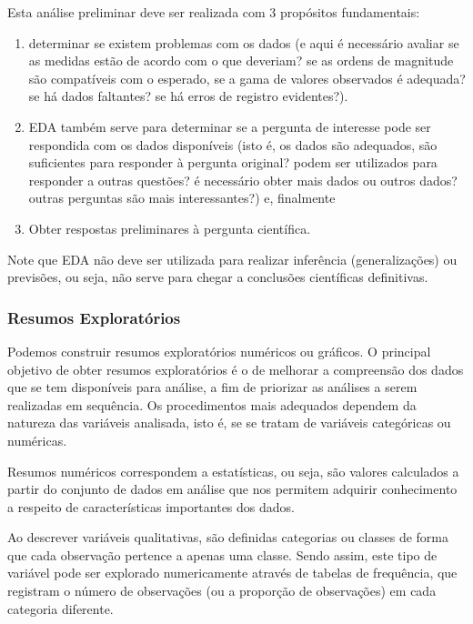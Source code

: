 \documentclass[
]{book}
\theoremstyle{definition}
\theoremstyle{definition}
\theoremstyle{definition}
\theoremstyle{remark}
\begin{document}
Esta análise preliminar deve ser realizada com 3 propósitos fundamentais:

\begin{enumerate}
\def\labelenumi{(\arabic{enumi})}
\item
  determinar se existem problemas com os dados (e aqui é necessário avaliar se as medidas estão de acordo com o que deveriam? se as ordens de magnitude são compatíveis com o esperado, se a gama de valores observados é adequada? se há dados faltantes? se há erros de registro evidentes?).
\item
  EDA também serve para determinar se a pergunta de interesse pode ser respondida com os dados disponíveis (isto é, os dados são adequados, são suficientes para responder à pergunta original? podem ser utilizados para responder a outras questões? é necessário obter mais dados ou outros dados? outras perguntas são mais interessantes?) e, finalmente
\item
  Obter respostas preliminares à pergunta científica.
\end{enumerate}

Note que EDA não deve ser utilizada para realizar inferência (generalizações) ou previsões, ou seja, não serve para chegar a conclusões científicas definitivas.

\hypertarget{resumos-exploratuxf3rios}{%
\subsubsection*{Resumos Exploratórios}\label{resumos-exploratuxf3rios}}

Podemos construir resumos exploratórios numéricos ou gráficos. O principal objetivo de obter resumos exploratórios é o de melhorar a compreensão dos dados que se tem disponíveis para análise, a fim de priorizar as análises a serem realizadas em sequência. Os procedimentos mais adequados dependem da natureza das variáveis analisada, isto é, se se tratam de variáveis categóricas ou numéricas.

Resumos numéricos correspondem a estatísticas, ou seja, são valores calculados a partir do conjunto de dados em análise que nos permitem adquirir conhecimento a respeito de características importantes dos dados.

Ao descrever variáveis qualitativas, são definidas categorias ou classes de forma que cada observação pertence a apenas uma classe. Sendo assim, este tipo de variável pode ser explorado numericamente através de tabelas de frequência, que registram o número de observações (ou a proporção de observações) em cada categoria diferente.
\end{document}
